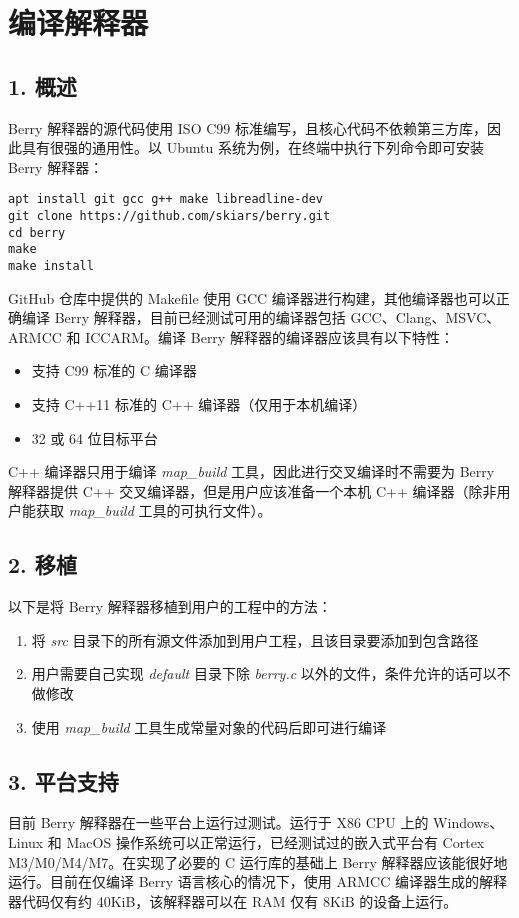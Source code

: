 \chapter{编译解释器}

\section*{1. 概述}

Berry 解释器的源代码使用 ISO C99 标准编写，且核心代码不依赖第三方库，因此具有很强的通用性。以 Ubuntu 系统为例，在终端中执行下列命令即可安装 Berry 解释器：
\begin{lstlisting}[numbers=none]
apt install git gcc g++ make libreadline-dev
git clone https://github.com/skiars/berry.git
cd berry
make
make install
\end{lstlisting}
GitHub 仓库中提供的 Makefile 使用 GCC 编译器进行构建，其他编译器也可以正确编译 Berry 解释器，目前已经测试可用的编译器包括 GCC、Clang、MSVC、ARMCC 和 ICCARM。编译 Berry 解释器的编译器应该具有以下特性：
\begin{itemize}
    \item 支持 C99 标准的 C 编译器
    \item 支持 C++11 标准的 C++ 编译器（仅用于本机编译）
    \item 32 或 64 位目标平台
\end{itemize}
C++ 编译器只用于编译 \textsl{map\_build} 工具，因此进行交叉编译时不需要为 Berry 解释器提供 C++ 交叉编译器，但是用户应该准备一个本机 C++ 编译器（除非用户能获取 \textsl{map\_build} 工具的可执行文件）。

\section*{2. 移植}

以下是将 Berry 解释器移植到用户的工程中的方法：
\begin{enumerate}
    \item 将 \textsl{src} 目录下的所有源文件添加到用户工程，且该目录要添加到包含路径
    \item 用户需要自己实现 \textsl{default} 目录下除 \textsl{berry.c} 以外的文件，条件允许的话可以不做修改
    \item 使用 \textsl{map\_build} 工具生成常量对象的代码后即可进行编译
\end{enumerate}

\section*{3. 平台支持}

目前 Berry 解释器在一些平台上运行过测试。运行于 X86 CPU 上的 Windows、Linux 和 MacOS 操作系统可以正常运行，已经测试过的嵌入式平台有 Cortex M3/M0/M4/M7。在实现了必要的 C 运行库的基础上 Berry 解释器应该能很好地运行。目前在仅编译 Berry 语言核心的情况下，使用 ARMCC 编译器生成的解释器代码仅有约 40KiB，该解释器可以在 RAM 仅有 8KiB 的设备上运行。

